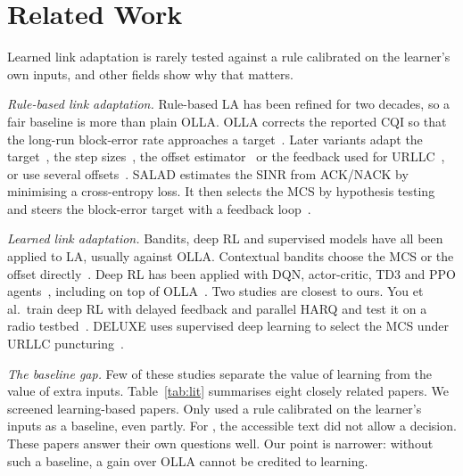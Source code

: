 \section{Related Work}\label{sec:related}
Learned link adaptation is rarely tested against a rule calibrated on the learner's own inputs, and other fields show why that matters.

\emph{Rule-based link adaptation.} Rule-based LA has been refined for two decades, so a fair baseline is more than plain OLLA. OLLA corrects the reported CQI so that the long-run block-error rate approaches a target~\cite{nakamura2002olla,pedersen2007fdps}. Later variants adapt the target~\cite{park2015targetbler}, the step sizes~\cite{blanquez2016eolla,sarret2015dolla,ohseki2016fastolla}, the offset estimator~\cite{delgado2017seqtest,zhu2023nolla} or the feedback used for URLLC~\cite{peralta2022ollaurllc}, or use several offsets~\cite{ahsen2026moolla}. SALAD estimates the SINR from ACK/NACK by minimising a cross-entropy loss. It then selects the MCS by hypothesis testing and steers the block-error target with a feedback loop~\cite{wiesmayr2025salad}.

\emph{Learned link adaptation.} Bandits, deep RL and supervised models have all been applied to LA, usually against OLLA. Contextual bandits choose the MCS or the offset directly~\cite{saxena2019cmab,saxena2022tuningfree,park2021twostagets,ku2024cmaburllc}. Deep RL has been applied with DQN, actor-critic, TD3 and PPO agents~\cite{ye2023drlla,pang2024td3olla,parsa2025qdrlla,demirel2025genrl}, including on top of OLLA~\cite{pulliyakode2017rlolla,kela2022delayolla,wang2026lolla}. Two studies are closest to ours. You et al.\ train deep RL with delayed feedback and parallel HARQ and test it on a radio testbed~\cite{you2026sim2real}. DELUXE uses supervised deep learning to select the MCS under URLLC puncturing~\cite{huang2022deluxe}.

\emph{The baseline gap.} Few of these studies separate the value of learning from the value of extra inputs. Table~\ref{tab:lit} summarises eight closely related papers. We screened \NLitN{} learning-based papers. Only \NLitCalPart{} used a rule calibrated on the learner's inputs as a baseline, even partly. For \NLitCalUnc{}, the accessible text did not allow a decision. These papers answer their own questions well. Our point is narrower: without such a baseline, a gain over OLLA cannot be credited to learning.

